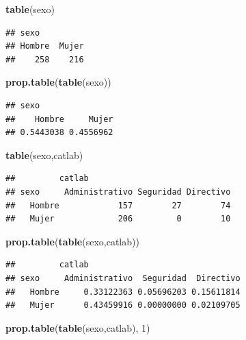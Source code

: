 \documentclass[]{book}
\newenvironment{Shaded}{\begin{snugshade}}{\end{snugshade}}
\newcommand{\DecValTok}[1]{\textcolor[rgb]{0.00,0.00,0.81}{#1}}
\newcommand{\KeywordTok}[1]{\textcolor[rgb]{0.13,0.29,0.53}{\textbf{#1}}}
\newcommand{\NormalTok}[1]{#1}
\begin{document}
\begin{Shaded}
\begin{Highlighting}[]
\KeywordTok{table}\NormalTok{(sexo)}
\end{Highlighting}
\end{Shaded}

\begin{verbatim}
## sexo
## Hombre  Mujer 
##    258    216
\end{verbatim}

\begin{Shaded}
\begin{Highlighting}[]
\KeywordTok{prop.table}\NormalTok{(}\KeywordTok{table}\NormalTok{(sexo))}
\end{Highlighting}
\end{Shaded}

\begin{verbatim}
## sexo
##    Hombre     Mujer 
## 0.5443038 0.4556962
\end{verbatim}

\begin{Shaded}
\begin{Highlighting}[]
\KeywordTok{table}\NormalTok{(sexo,catlab)}
\end{Highlighting}
\end{Shaded}

\begin{verbatim}
##         catlab
## sexo     Administrativo Seguridad Directivo
##   Hombre            157        27        74
##   Mujer             206         0        10
\end{verbatim}

\begin{Shaded}
\begin{Highlighting}[]
\KeywordTok{prop.table}\NormalTok{(}\KeywordTok{table}\NormalTok{(sexo,catlab))}
\end{Highlighting}
\end{Shaded}

\begin{verbatim}
##         catlab
## sexo     Administrativo  Seguridad  Directivo
##   Hombre     0.33122363 0.05696203 0.15611814
##   Mujer      0.43459916 0.00000000 0.02109705
\end{verbatim}

\begin{Shaded}
\begin{Highlighting}[]
\KeywordTok{prop.table}\NormalTok{(}\KeywordTok{table}\NormalTok{(sexo,catlab), }\DecValTok{1}\NormalTok{)}
\end{Highlighting}
\end{Shaded}
\end{document}
